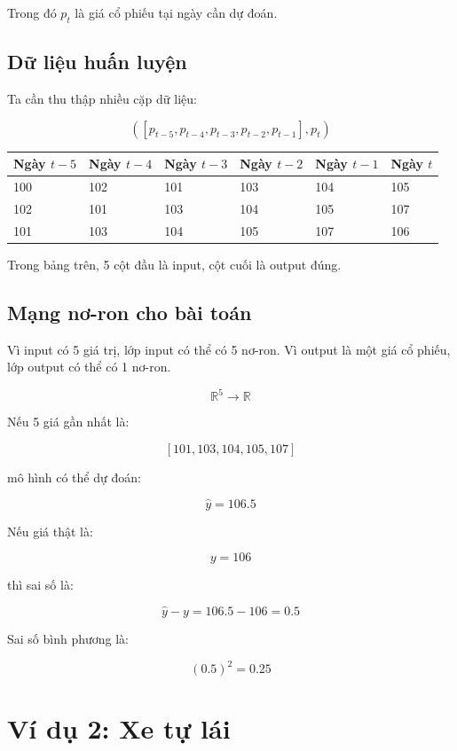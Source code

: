 \documentclass[12pt,a4paper]{report}
\begin{document}
Trong đó $p_t$ là giá cổ phiếu tại ngày cần dự đoán.

\section{Dữ liệu huấn luyện}

Ta cần thu thập nhiều cặp dữ liệu:

\[
    ([p_{t-5},p_{t-4},p_{t-3},p_{t-2},p_{t-1}], p_t)
\]

\begin{center}
\begin{tabular}{llllll}
\toprule
Ngày $t-5$ & Ngày $t-4$ & Ngày $t-3$ & Ngày $t-2$ & Ngày $t-1$ & Ngày $t$ \\
\midrule
100 & 102 & 101 & 103 & 104 & 105 \\
102 & 101 & 103 & 104 & 105 & 107 \\
101 & 103 & 104 & 105 & 107 & 106 \\
\bottomrule
\end{tabular}
\end{center}

Trong bảng trên, 5 cột đầu là input, cột cuối là output đúng.

\section{Mạng nơ-ron cho bài toán}

Vì input có 5 giá trị, lớp input có thể có 5 nơ-ron. Vì output là một giá cổ phiếu, lớp output có thể có 1 nơ-ron.

\[
    \mathbb{R}^5 \rightarrow \mathbb{R}
\]

\begin{vidu}
Nếu 5 giá gần nhất là:

\[
    [101, 103, 104, 105, 107]
\]

mô hình có thể dự đoán:

\[
    \hat{y} = 106.5
\]

Nếu giá thật là:

\[
    y = 106
\]

thì sai số là:

\[
    \hat{y} - y = 106.5 - 106 = 0.5
\]

Sai số bình phương là:

\[
    (0.5)^2 = 0.25
\]
\end{vidu}

\chapter{Ví dụ 2: Xe tự lái}
\end{document}

